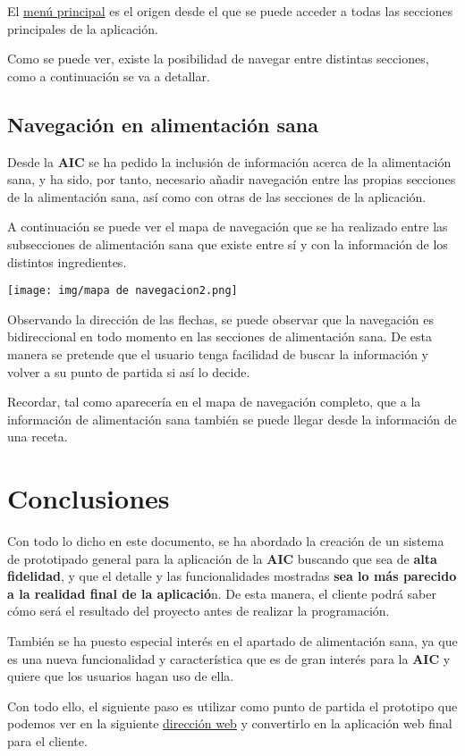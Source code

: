 \documentclass{\ClassPath/viu-tfm-template}
\begin{document}
El \hyperlink{menu_principal}{menú principal} es el origen desde el que se puede acceder a todas las secciones principales de la aplicación.

Como se puede ver, existe la posibilidad de navegar entre distintas secciones, como a continuación se va a detallar.



\section{Navegación en alimentación sana}

Desde la \textbf{AIC} se ha pedido la inclusión de información acerca de la alimentación sana, y ha sido, por tanto, necesario añadir navegación entre las propias secciones de la alimentación sana, así como con otras de las secciones de la aplicación.

A continuación se puede ver el mapa de navegación que se ha realizado entre las subsecciones de alimentación sana que existe entre sí y con la información de los distintos ingredientes.

\begin{center}
    \vspace{-10pt}
    \texttt{[image: img/mapa de navegacion2.png]}
    \vspace{-20pt}
\end{center}

Observando la dirección de las flechas, se puede observar que la navegación es bidireccional en todo momento en las secciones de alimentación sana. De esta manera se pretende que el usuario tenga facilidad de buscar la información y volver a su punto de partida si así lo decide.

Recordar, tal como aparecería en el mapa de navegación completo, que a la información de alimentación sana también se puede llegar desde la información de una receta.


\chapter{Conclusiones}

Con todo lo dicho en este documento, se ha abordado la creación de un sistema de prototipado general para la aplicación de la \textbf{AIC} buscando que sea de \textbf{alta fidelidad}, y que el detalle y las funcionalidades mostradas \textbf{sea lo más parecido a la realidad final de la aplicació}n. De esta manera, el cliente podrá saber cómo será el resultado del proyecto antes de realizar la programación.

También se ha puesto especial interés en el apartado de alimentación sana, ya que es una nueva funcionalidad y característica que es de gran interés para la \textbf{AIC} y quiere que los usuarios hagan uso de ella.

Con todo ello, el siguiente paso es utilizar como punto de partida el prototipo que podemos ver en la siguiente \href{https://yuki.github.io/VIU_03MASW/preview.html}{dirección web} y convertirlo en la aplicación web final para el cliente.


\end{document}
